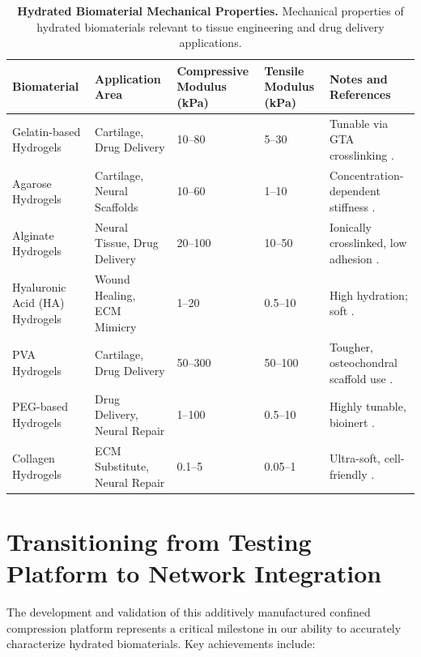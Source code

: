\begin{table}[H]
    \centering
    \caption{\textbf{Hydrated Biomaterial Mechanical Properties.} Mechanical properties of hydrated biomaterials relevant to tissue engineering and drug delivery applications.}\label{tab:biomaterial_mechanics}
    \renewcommand{\arraystretch}{1.3}
    \setlength{\tabcolsep}{6pt}
    \begin{tabular}{|p{3.8cm}|p{2.5cm}|p{2cm}|p{2cm}|p{5cm}|}
    \hline
    \rowcolor{gray!30}
    \textbf{Biomaterial} & \textbf{Application Area} & \textbf{Compressive Modulus (kPa)} & \textbf{Tensile Modulus (kPa)} & \textbf{Notes and References} \\
    \hline
    Gelatin-based Hydrogels& Cartilage, Drug Delivery& 10--80 & 5--30 & Tunable via GTA crosslinking \cite{chaudhuri2016hydrogels, roberts2011mechanicalproperties}. \\
    \hline
    Agarose Hydrogels & Cartilage, Neural Scaffolds& 10--60 & 1--10 & Concentration-dependent stiffness \cite{buschmann1998mechanicalproperties}. \\
    \hline
    Alginate Hydrogels & Neural Tissue, Drug Delivery & 20--100 & 10--50 & Ionically crosslinked, low adhesion \cite{rowley1999alginatehydrogels}. \\
    \hline
    Hyaluronic Acid (HA) Hydrogels& Wound Healing, ECM Mimicry & 1--20 & 0.5--10 & High hydration; soft \cite{chaudhuri2016hydrogels}. \\
    \hline
    PVA Hydrogels & Cartilage, Drug Delivery & 50--300 & 50--100 & Tougher, osteochondral scaffold use \cite{matsumoto2005pvahydrogels}. \\
    \hline
    PEG-based Hydrogels& Drug Delivery, Neural Repair & 1--100 & 0.5--10 & Highly tunable, bioinert \cite{nichol2010cellviability}. \\
    \hline
    Collagen Hydrogels & ECM Substitute, Neural Repair & 0.1--5 & 0.05--1 & Ultra-soft, cell-friendly \cite{yang2004collagenhydrogels}. \\
    \hline
    \end{tabular}
    \end{table}
    
\section{Transitioning from Testing Platform to Network Integration}

The development and validation of this additively manufactured confined compression platform represents a critical milestone in our ability to accurately characterize hydrated biomaterials. Key achievements include:

